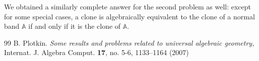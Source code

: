 \documentclass[a4paper]{article} %
\begin{document}
We obtained a similarly complete answer for the second problem as well: except for some special cases, a clone is algebraically equivalent to the clone of a normal band $\mathbb A$ if and only if it is the clone of $\mathbb A$.
\begin{thebibliography}{99}
B. Plotkin. 
\newblock \emph{Some results and problems related to universal algebraic geometry,} 
\newblock Internat. J. Algebra Comput. \textbf{17}, no. 5-6, 1133--1164 (2007)

\end{thebibliography}
\end{document}
